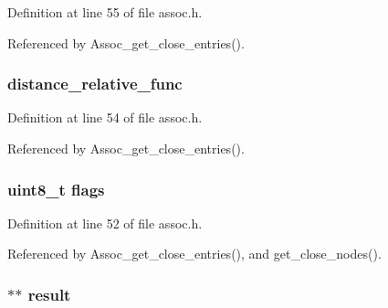 Definition at line 55 of file assoc.\+h.



Referenced by Assoc\+\_\+get\+\_\+close\+\_\+entries().

\hypertarget{struct_assoc__close__entries_ada046356cf0fe3d4a2c18ac174d5eb0e}{
\subsubsection[{distance\+\_\+relative\+\_\+func}]{ distance\+\_\+relative\+\_\+func}}\label{struct_assoc__close__entries_ada046356cf0fe3d4a2c18ac174d5eb0e}


Definition at line 54 of file assoc.\+h.



Referenced by Assoc\+\_\+get\+\_\+close\+\_\+entries().

\hypertarget{struct_assoc__close__entries_aa2585d779da0ab21273a8d92de9a0ebe}{
\subsubsection[{flags}]{\setlength{\rightskip}{0pt plus 5cm}uint8\+\_\+t flags}}\label{struct_assoc__close__entries_aa2585d779da0ab21273a8d92de9a0ebe}


Definition at line 52 of file assoc.\+h.



Referenced by Assoc\+\_\+get\+\_\+close\+\_\+entries(), and get\+\_\+close\+\_\+nodes().

\hypertarget{struct_assoc__close__entries_a40d6704f891338dadfa89f46b696be4c}{
\subsubsection[{result}]{$\ast$$\ast$ result}}\label{struct_assoc__close__entries_a40d6704f891338dadfa89f46b696be4c}


